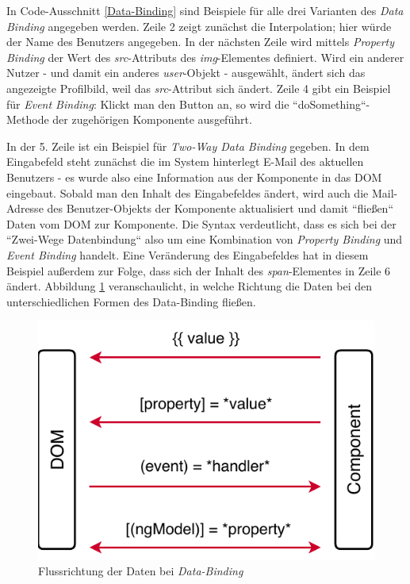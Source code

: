 In Code-Ausschnitt \ref{Data-Binding} sind Beispiele für alle drei Varianten des \textit{Data Binding} angegeben werden. Zeile 2 zeigt zunächst die Interpolation; hier würde der Name des Benutzers angegeben. In der nächsten Zeile wird mittels \textit{Property Binding} der Wert des \textit{src}-Attributs des \textit{img}-Elementes definiert. Wird ein anderer Nutzer - und damit ein anderes \textit{user}-Objekt - ausgewählt, ändert sich das angezeigte Profilbild, weil das \textit{src}-Attribut sich ändert. Zeile 4 gibt ein Beispiel für \textit{Event Binding}: Klickt man den Button an, so wird die ``doSomething``-Methode der zugehörigen Komponente ausgeführt.

In der 5. Zeile ist ein Beispiel für \textit{Two-Way Data Binding} gegeben. In dem Eingabefeld steht zunächst die im System hinterlegt E-Mail des aktuellen Benutzers - es wurde also eine Information aus der Komponente in das \acs{DOM} eingebaut. Sobald man den Inhalt des Eingabefeldes ändert, wird auch die Mail-Adresse des Benutzer-Objekts der Komponente aktualisiert und damit ``fließen`` Daten vom \acs{DOM} zur Komponente. Die Syntax verdeutlicht, dass es sich bei der ``Zwei-Wege Datenbindung`` also um eine Kombination von \textit{Property Binding} und \textit{Event Binding} handelt. Eine Veränderung des Eingabefeldes hat in diesem Beispiel außerdem zur Folge, dass sich der Inhalt des \textit{span}-Elementes in Zeile 6 ändert. Abbildung \ref{fig:technologies:databinding} veranschaulicht, in welche Richtung die Daten bei den unterschiedlichen Formen des Data-Binding fließen.

\begin{figure}[h]
\centering
\includegraphics{gfx/DataBinding}
\caption[Flussrichtung der Daten bei \textit{Data-Binding}]{Flussrichtung der Daten bei \textit{Data-Binding}\cite{Data-Binding}}
\label{fig:technologies:databinding}
\end{figure}
